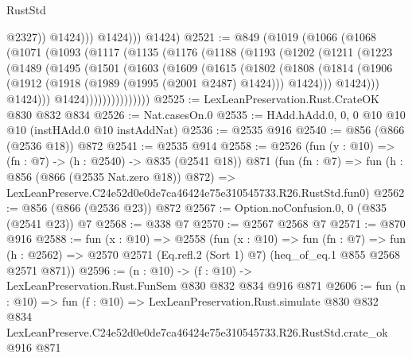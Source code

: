 \begin{lexlean}{RustStd}
\begin{coremodule}
                      @2327))
                  @1424)))
            @1424)))
      @1424)
@2521 := @849
    (@1019
      (@1066
        (@1068
          (@1071
            (@1093
              (@1117
                (@1135
                  (@1176
                    (@1188
                      (@1193
                        (@1202
                          (@1211
                            (@1223
                              (@1489
                                (@1495
                                  (@1501
                                    (@1603
                                      (@1609
                                        (@1615
                                          (@1802
                                            (@1808
                                              (@1814
                                                (@1906
                                                  (@1912
                                                    (@1918 (@1989 (@1995 (@2001 @2487) @1424)))
                                                    @1424)))
                                              @1424)))
                                        @1424)))
                                  @1424)))))))))))))))
@2525 := LexLeanPreservation.Rust.CrateOK @830 @832 @834
@2526 := Nat.casesOn.{0}
@2535 := HAdd.hAdd.{0, 0, 0} @10 @10 @10 (instHAdd.{0} @10 instAddNat)
@2536 := @2535 @916
@2540 := @856 (@866 (@2536 @18)) @872
@2541 := @2535 @914
@2558 := @2526
    (fun (y : @10) => (fn : @7) -> (h : @2540) -> @835 (@2541 @18))
    @871
    (fun (fn : @7) =>
    fun (h : @856 (@866 (@2535 Nat.zero @18)) @872) =>
    LexLeanPreserve.C24e52d0e0de7ca46424e75e310545733.R26.RustStd.fun0)
@2562 := @856 (@866 (@2536 @23)) @872
@2567 := Option.noConfusion.{0, 0} (@835 (@2541 @23)) @7
@2568 := @338 @7
@2570 := @2567 @2568 @7
@2571 := @870 @916
@2588 := fun (x : @10) =>
  @2558
    (fun (x : @10) =>
    fun (fn : @7) =>
    fun (h : @2562) => @2570 @2571 (Eq.refl.{2} (Sort 1) @7) (heq_of_eq.{1} @855 @2568 @2571 @871))
@2596 := (n : @10) -> (f : @10) -> LexLeanPreservation.Rust.FunSem @830 @832 @834 @916 @871
@2606 := fun (n : @10) =>
  fun (f : @10) =>
  LexLeanPreservation.Rust.simulate
    @830
    @832
    @834
    LexLeanPreserve.C24e52d0e0de7ca46424e75e310545733.R26.RustStd.crate_ok
    @916
    @871
\end{coremodule}
\end{lexlean}

